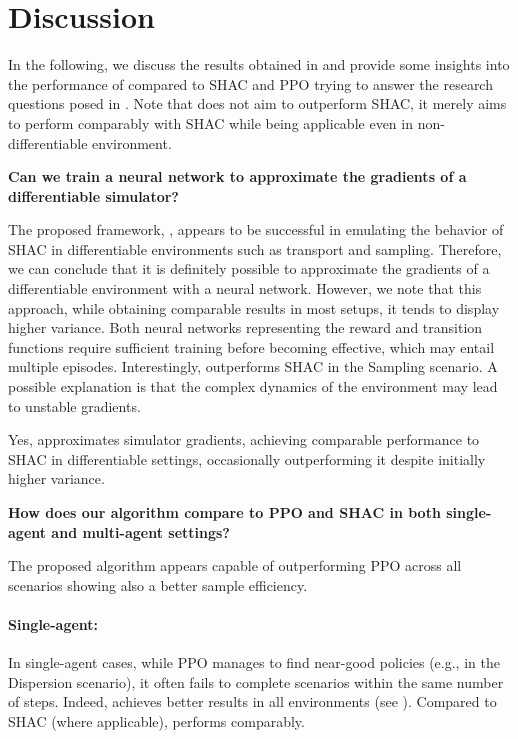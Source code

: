 \section{Discussion}
In the following, we discuss the results obtained in  and provide some insights into the performance of \fname{} compared to SHAC and PPO trying to answer the research questions posed in . Note that \fname{} does not aim to outperform SHAC, it merely aims to perform comparably with SHAC while being applicable even in non-differentiable environment. 
\begin{rqbox}
\textbf{Can we train a neural network to approximate the gradients of a differentiable simulator?}
\end{rqbox}

The proposed framework, \fname{}, appears to be successful in emulating the behavior of SHAC in differentiable environments such as transport and sampling. Therefore, we can conclude that it is definitely possible to approximate the gradients of a differentiable environment with a neural network. However, we note that this approach, while obtaining comparable results in most setups, it tends to display higher variance. Both neural networks representing the reward and transition functions require sufficient training before becoming effective, which may entail multiple episodes. Interestingly, \fname{} outperforms SHAC in the Sampling scenario. A possible explanation is that the complex dynamics of the environment may lead to unstable gradients.

\begin{replybox}
Yes, \fname{} approximates simulator gradients, achieving comparable performance to SHAC in differentiable settings, occasionally outperforming it despite initially higher variance.
\end{replybox}

\begin{rqbox}
\textbf{How does our algorithm compare to PPO and SHAC in both single-agent and multi-agent settings?}
\end{rqbox}

The proposed algorithm appears capable of outperforming PPO across all scenarios showing also a better sample efficiency. 

\noindent\paragraph{Single-agent:} In single-agent cases, while PPO manages to find near-good policies (e.g., in the Dispersion scenario), it often fails to complete scenarios within the same number of steps. Indeed, \fname{} achieves better results in all environments (see ). Compared to SHAC (where applicable), \fname{} performs comparably.

